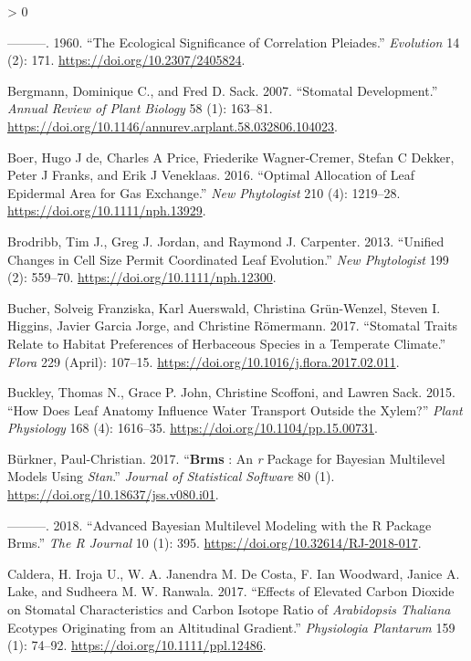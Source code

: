 \documentclass[
  10pt,
]{article}
\newlength{\cslhangindent}
\newenvironment{CSLReferences}[2] %
 {%
  \setlength{\parindent}{0pt}
  \ifodd #1 \everypar{\setlength{\hangindent}{\cslhangindent}}\ignorespaces\fi
  \ifnum #2 > 0
  \setlength{\parskip}{#2\baselineskip}
  \fi
 }%
 {}
\begin{document}
\begin{CSLReferences}{1}{0}
\leavevmode\hypertarget{ref-berg_ecological_1960}{}%
---------. 1960. {``The {Ecological} {Significance} of {Correlation} {Pleiades}.''} \emph{Evolution} 14 (2): 171. \url{https://doi.org/10.2307/2405824}.

\leavevmode\hypertarget{ref-bergmann_stomatal_2007}{}%
Bergmann, Dominique C., and Fred D. Sack. 2007. {``Stomatal {Development}.''} \emph{Annual Review of Plant Biology} 58 (1): 163--81. \url{https://doi.org/10.1146/annurev.arplant.58.032806.104023}.

\leavevmode\hypertarget{ref-de_boer_optimal_2016}{}%
Boer, Hugo J de, Charles A Price, Friederike Wagner‐Cremer, Stefan C Dekker, Peter J Franks, and Erik J Veneklaas. 2016. {``Optimal Allocation of Leaf Epidermal Area for Gas Exchange.''} \emph{New Phytologist} 210 (4): 1219--28. \url{https://doi.org/10.1111/nph.13929}.

\leavevmode\hypertarget{ref-brodribb_unified_2013}{}%
Brodribb, Tim J., Greg J. Jordan, and Raymond J. Carpenter. 2013. {``Unified Changes in Cell Size Permit Coordinated Leaf Evolution.''} \emph{New Phytologist} 199 (2): 559--70. \url{https://doi.org/10.1111/nph.12300}.

\leavevmode\hypertarget{ref-bucher_stomatal_2017}{}%
Bucher, Solveig Franziska, Karl Auerswald, Christina Grün-Wenzel, Steven I. Higgins, Javier Garcia Jorge, and Christine Römermann. 2017. {``Stomatal Traits Relate to Habitat Preferences of Herbaceous Species in a Temperate Climate.''} \emph{Flora} 229 (April): 107--15. \url{https://doi.org/10.1016/j.flora.2017.02.011}.

\leavevmode\hypertarget{ref-buckley_how_2015}{}%
Buckley, Thomas N., Grace P. John, Christine Scoffoni, and Lawren Sack. 2015. {``How {Does} {Leaf} {Anatomy} {Influence} {Water} {Transport} Outside the {Xylem}?''} \emph{Plant Physiology} 168 (4): 1616--35. \url{https://doi.org/10.1104/pp.15.00731}.

\leavevmode\hypertarget{ref-burkner_brms_2017}{}%
Bürkner, Paul-Christian. 2017. {``\textbf{Brms} : {An} \emph{r} {Package} for {Bayesian} {Multilevel} {Models} {Using} \emph{Stan}.''} \emph{Journal of Statistical Software} 80 (1). \url{https://doi.org/10.18637/jss.v080.i01}.

\leavevmode\hypertarget{ref-burkner_advanced_2018}{}%
---------. 2018. {``Advanced {Bayesian} {Multilevel} {Modeling} with the {R} {Package} Brms.''} \emph{The R Journal} 10 (1): 395. \url{https://doi.org/10.32614/RJ-2018-017}.

\leavevmode\hypertarget{ref-caldera_effects_2017}{}%
Caldera, H. Iroja U., W. A. Janendra M. De Costa, F. Ian Woodward, Janice A. Lake, and Sudheera M. W. Ranwala. 2017. {``Effects of Elevated Carbon Dioxide on Stomatal Characteristics and Carbon Isotope Ratio of \emph{{Arabidopsis} Thaliana} Ecotypes Originating from an Altitudinal Gradient.''} \emph{Physiologia Plantarum} 159 (1): 74--92. \url{https://doi.org/10.1111/ppl.12486}.


\end{CSLReferences}
\end{document}

